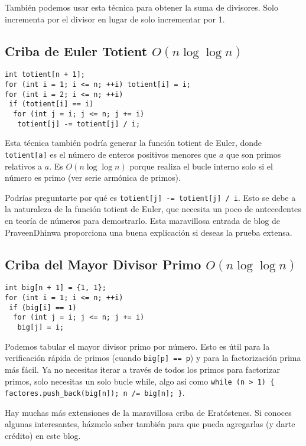 \documentclass[11pt]{scrartcl}
\begin{document}
También podemos usar esta técnica para obtener la suma de divisores. Solo incrementa por el divisor en lugar de solo incrementar por 1.

\subsection*{Criba de Euler Totient \( O(n \log \log n) \)}

\begin{verbatim}
int totient[n + 1];
for (int i = 1; i <= n; ++i) totient[i] = i;
for (int i = 2; i <= n; ++i)
 if (totient[i] == i)
  for (int j = i; j <= n; j += i)
   totient[j] -= totient[j] / i;
\end{verbatim}

Esta técnica también podría generar la función totient de Euler, donde \texttt{totient[a]} es el número de enteros positivos menores que \( a \) que son primos relativos a \( a \). Es \( O(n \log \log n) \) porque realiza el bucle interno solo si el número es primo (ver serie armónica de primos).

Podrías preguntarte por qué es \texttt{totient[j] -= totient[j] / i}. Esto se debe a la naturaleza de la función totient de Euler, que necesita un poco de antecedentes en teoría de números para demostrarlo. Esta maravillosa entrada de blog de PraveenDhinwa proporciona una buena explicación si deseas la prueba extensa.

\subsection*{Criba del Mayor Divisor Primo \( O(n \log \log n) \)}

\begin{verbatim}
int big[n + 1] = {1, 1};
for (int i = 1; i <= n; ++i)
 if (big[i] == 1)
  for (int j = i; j <= n; j += i)
   big[j] = i;
\end{verbatim}

Podemos tabular el mayor divisor primo por número. Esto es útil para la verificación rápida de primos (cuando \texttt{big[p] == p}) y para la factorización prima más fácil. Ya no necesitas iterar a través de todos los primos para factorizar primos, solo necesitas un solo bucle while, algo así como \texttt{while (n > 1) \{ factores.push\_back(big[n]); n /= big[n]; \}}.

Hay muchas más extensiones de la maravillosa criba de Eratóstenes. Si conoces algunas interesantes, házmelo saber también para que pueda agregarlas (y darte crédito) en este blog.
\end{document}
